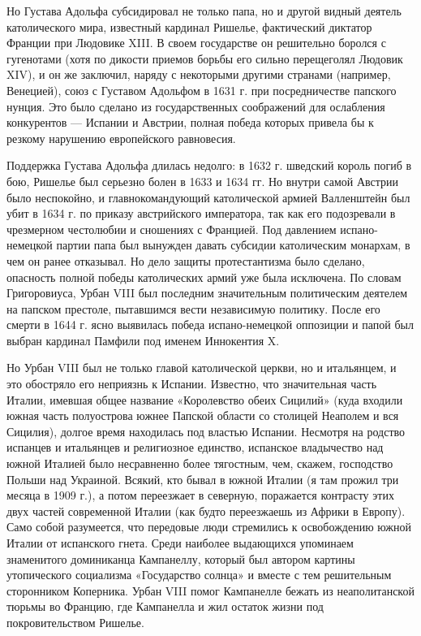 Но Густава Адольфа субсидировал не только папа, но и другой видный деятель
католического мира, известный кардинал Ришелье, фактический диктатор Франции
при Людовике XIII. В своем государстве он решительно боролся с гугенотами (хотя
по дикости приемов борьбы его сильно перещеголял Людовик XIV), и он же
заключил, наряду с некоторыми другими странами (например, Венецией), союз с
Густавом Адольфом в 1631 г. при посредничестве папского нунция. Это было
сделано из государственных соображений для ослабления конкурентов --- Испании и
Австрии, полная победа которых привела бы к резкому нарушению европейского
равновесия.

Поддержка Густава Адольфа длилась недолго: в 1632 г. шведский король погиб в
бою, Ришелье был серьезно болен в 1633 и 1634 гг. Но внутри самой Австрии было
неспокойно, и главнокомандующий католической армией Валленштейн был убит в 1634
г. по приказу австрийского императора, так как его подозревали в чрезмерном
честолюбии и сношениях с Францией. Под давлением испано-немецкой партии папа
был вынужден давать субсидии католическим монархам, в чем он ранее отказывал.
Но дело защиты протестантизма было сделано, опасность полной победы
католических армий уже была исключена. По словам Григоровиуса, Урбан VIII был
последним значительным политическим деятелем на папском престоле, пытавшимся
вести независимую политику. После его смерти в 1644 г. ясно выявилась победа
испано-немецкой оппозиции и папой был выбран кардинал Памфили под именем
Иннокентия X.

Но Урбан VIII был не только главой католической церкви, но и итальянцем, и это
обостряло его неприязнь к Испании. Известно, что значительная часть Италии,
имевшая общее название «Королевство обеих Сицилий» (куда входили южная часть
полуострова южнее Папской области со столицей Неаполем и вся Сицилия), долгое
время находилась под властью Испании. Несмотря на родство испанцев и итальянцев
и религиозное единство, испанское владычество над южной Италией было
несравненно более тягостным, чем, скажем, господство Польши над Украиной.
Всякий, кто бывал в южной Италии (я там прожил три месяца в 1909 г.), а потом
переезжает в северную, поражается контрасту этих двух частей современной Италии
(как будто переезжаешь из Африки в Европу). Само собой разумеется, что
передовые люди стремились к освобождению южной Италии от испанского гнета.
Среди наиболее выдающихся упоминаем знаменитого доминиканца Кампанеллу, который
был автором картины утопического социализма «Государство солнца» и вместе с тем
решительным сторонником Коперника. Урбан VIII помог Кампанелле бежать из
неаполитанской тюрьмы во Францию, где Кампанелла и жил остаток жизни под
покровительством Ришелье.

